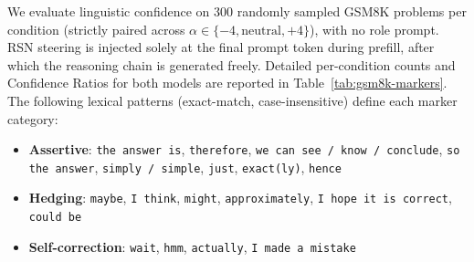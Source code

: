\documentclass{article}
\begin{document}
We evaluate linguistic confidence on 300 randomly sampled GSM8K problems per condition (strictly paired across $\alpha \in \{-4, \text{neutral}, +4\}$), with no role prompt. RSN steering is injected solely at the final prompt token during prefill, after which the reasoning chain is generated freely. Detailed per-condition counts and Confidence Ratios for both models are reported in Table~\ref{tab:gsm8k-markers}. The following lexical patterns (exact-match, case-insensitive) define each marker category:

\begin{itemize}[noitemsep]
  \item \textbf{Assertive}: \texttt{the answer is}, \texttt{therefore}, \texttt{we can see / know / conclude}, \texttt{so the answer}, \texttt{simply / simple}, \texttt{just}, \texttt{exact(ly)}, \texttt{hence}
  \item \textbf{Hedging}: \texttt{maybe}, \texttt{I think}, \texttt{might}, \texttt{approximately}, \texttt{I hope it is correct}, \texttt{could be}
  \item \textbf{Self-correction}: \texttt{wait}, \texttt{hmm}, \texttt{actually}, \texttt{I made a mistake}
\end{itemize}
\end{document}

